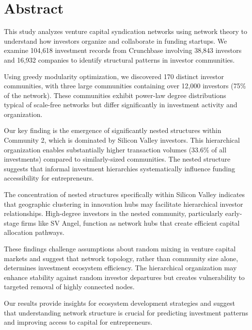 \section*{Abstract}

This study analyzes venture capital syndication networks using network theory to understand how investors organize and collaborate in funding startups. We examine 104,618 investment records from Crunchbase involving 38,843 investors and 16,932 companies to identify structural patterns in investor communities.

Using greedy modularity optimization, we discovered 170 distinct investor communities, with three large communities containing over 12,000 investors (75\% of the network). These communities exhibit power-law degree distributions typical of scale-free networks but differ significantly in investment activity and organization.

Our key finding is the emergence of significantly nested structures within Community 2, which is dominated by Silicon Valley investors. This hierarchical organization enables substantially higher transaction volumes (33.6\% of all investments) compared to similarly-sized communities. The nested structure suggests that informal investment hierarchies systematically influence funding accessibility for entrepreneurs.


The concentration of nested structures specifically within Silicon Valley indicates that geographic clustering in innovation hubs may facilitate hierarchical investor relationships. High-degree investors in the nested community, particularly early-stage firms like SV Angel, function as network hubs that create efficient capital allocation pathways.

These findings challenge assumptions about random mixing in venture capital markets and suggest that network topology, rather than community size alone, determines investment ecosystem efficiency. The hierarchical organization may enhance stability against random investor departures but creates vulnerability to targeted removal of highly connected nodes.

Our results provide insights for ecosystem development strategies and suggest that understanding network structure is crucial for predicting investment patterns and improving access to capital for entrepreneurs.